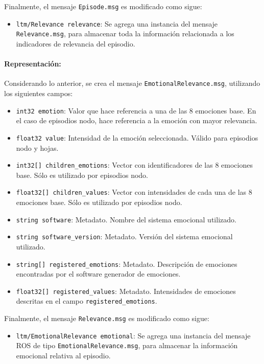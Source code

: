 Finalmente, el mensaje \texttt{Episode.msg} es modificado como sigue:
\begin{itemize}
	\item \texttt{ltm/Relevance relevance}: Se agrega una instancia del mensaje \texttt{Relevance.msg}, para almacenar toda la información relacionada a los indicadores de relevancia del episodio.
\end{itemize}

\paragraph{Representación:}
Considerando lo anterior, se crea el mensaje \texttt{EmotionalRelevance.msg}, utilizando los siguientes campos:
\begin{itemize}
	\item \texttt{int32 emotion}: Valor que hace referencia a una de las 8 emociones base. En el caso de episodios nodo, hace referencia a la emoción con mayor relevancia.
	\item \texttt{float32 value}: Intensidad de la emoción seleccionada. Válido para episodios nodo y hojas.
	\item \texttt{int32[] children\_emotions}: Vector con identificadores de las 8 emociones base. Sólo es utilizado por episodios nodo.
	\item \texttt{float32[] children\_values}: Vector con intensidades de cada una de las 8 emociones base. Sólo es utilizado por episodios nodo.
	\item \texttt{string software}: Metadato. Nombre del sistema emocional utilizado.
	\item \texttt{string software\_version}: Metadato. Versión del sistema emocional utilizado.
	\item \texttt{string[] registered\_emotions}: Metadato. Descripción de emociones encontradas por el software generador de emociones. 
	\item \texttt{float32[] registered\_values}: Metadato. Intensidades de emociones descritas en el campo \texttt{registered\_emotions}.
\end{itemize}

Finalmente, el mensaje \texttt{Relevance.msg} es modificado como sigue:
\begin{itemize}
	\item \texttt{ltm/EmotionalRelevance emotional}: Se agrega una instancia del mensaje ROS de tipo \texttt{EmotionalRelevance.msg}, para almacenar la información emocional relativa al episodio.
\end{itemize}


